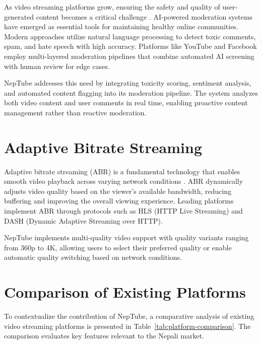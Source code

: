 As video streaming platforms grow, ensuring the safety and quality of user-generated content becomes a critical challenge \cite{risch2020toxic}. AI-powered moderation systems have emerged as essential tools for maintaining healthy online communities. Modern approaches utilize natural language processing to detect toxic comments, spam, and hate speech with high accuracy. Platforms like YouTube and Facebook employ multi-layered moderation pipelines that combine automated AI screening with human review for edge cases.

NepTube addresses this need by integrating toxicity scoring, sentiment analysis, and automated content flagging into its moderation pipeline. The system analyzes both video content and user comments in real time, enabling proactive content management rather than reactive moderation.

\section{Adaptive Bitrate Streaming}

Adaptive bitrate streaming (ABR) is a fundamental technology that enables smooth video playback across varying network conditions \cite{flowplayer2023abr, choi2023qoe}. ABR dynamically adjusts video quality based on the viewer's available bandwidth, reducing buffering and improving the overall viewing experience. Leading platforms implement ABR through protocols such as HLS (HTTP Live Streaming) and DASH (Dynamic Adaptive Streaming over HTTP).

NepTube implements multi-quality video support with quality variants ranging from 360p to 4K, allowing users to select their preferred quality or enable automatic quality switching based on network conditions.

\section{Comparison of Existing Platforms}

To contextualize the contribution of NepTube, a comparative analysis of existing video streaming platforms is presented in Table~\ref{tab:platform-comparison}. The comparison evaluates key features relevant to the Nepali market.

